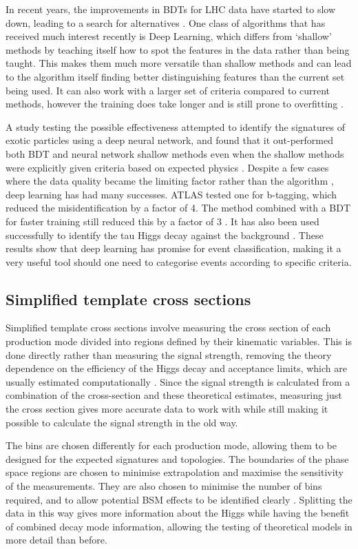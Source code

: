 \documentclass[12pt]{article}
\begin{document}
In recent years, the improvements in BDTs for LHC data have started to slow down, leading to a search for alternatives \cite{ml9}. One class of algorithms that has received much interest recently is Deep Learning, which differs from `shallow' methods by teaching itself how to spot the features in the data rather than being taught. This makes them much more versatile than shallow methods and can lead to the algorithm itself finding better distinguishing features than the current set being used. It can also work with a larger set of criteria compared to current methods, however the training does take longer and is still prone to overfitting \cite{ml12}. 

A study testing the possible effectiveness attempted to identify the signatures of exotic particles using a deep neural network, and found that it out-performed both BDT and neural network shallow methods even when the shallow methods were explicitly given criteria based on expected physics \cite{ml9}. Despite a few cases where the data quality became the limiting factor rather than the algorithm \cite{ml3}, deep learning has had many successes. ATLAS tested one for b-tagging, which reduced the misidentification by a factor of 4. The method combined with a BDT for faster training still reduced this by a factor of 3 \cite{ml10}. It has also been used successfully to identify the tau Higgs decay against the background \cite{ml11}. These results show that deep learning has promise for event classification, making it a very useful tool should one need to categorise events according to specific criteria. 


\subsection*{Simplified template cross sections}
Simplified template cross sections involve measuring the cross section of each production mode divided into regions defined by their kinematic variables. This is done directly rather than measuring the signal strength, removing the theory dependence on the efficiency of the Higgs decay and acceptance limits, which are usually estimated computationally \cite{stxs1}. Since the signal strength is calculated from a combination of the cross-section and these theoretical estimates, measuring just the cross section gives more accurate data to work with while still making it possible to calculate the signal strength in the old way.

The bins are chosen differently for each production mode, allowing them to be designed for the expected signatures and topologies. The boundaries of the phase space regions are chosen to minimise extrapolation and maximise the sensitivity of the measurements. They are also chosen to minimise the number of bins required, and to allow potential BSM effects to be identified clearly \cite{stxs4}. Splitting the data in this way gives more information about the Higgs while having the benefit of combined decay mode information, allowing the testing of theoretical models in more detail than before. 
\end{document}
